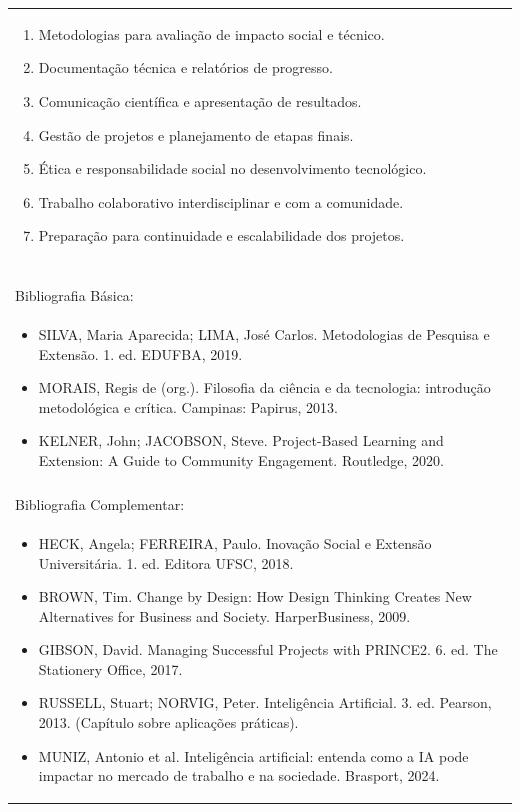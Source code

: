 \documentclass[11pt]{article}
\begin{document}
\begin{center}
\begin{longtable}{|p{4cm}|p{4cm}|p{4cm}|p{4cm}|}
{\begin{enumerate}
\item Metodologias para avaliação de impacto social e técnico.
\item Documentação técnica e relatórios de progresso.
\item Comunicação científica e apresentação de resultados.
\item Gestão de projetos e planejamento de etapas finais.
\item Ética e responsabilidade social no desenvolvimento tecnológico.
\item Trabalho colaborativo interdisciplinar e com a comunidade.
\item Preparação para continuidade e escalabilidade dos projetos.\end{enumerate}}\\
\multicolumn{4}{|p{16cm}|}{}\\
\multicolumn{4}{|p{16cm}|}{}\\
\multicolumn{4}{|p{16cm}|}{\vspace{-1cm}}\\
\multicolumn{4}{|p{16cm}|}{}\\
\hline
\multicolumn{4}{|p{16cm}|}{Bibliografia Básica:}\\
\multicolumn{4}{|p{16cm}|}{%
\begin{itemize}\item SILVA, Maria Aparecida; LIMA, José Carlos. Metodologias de Pesquisa e Extensão. 1. ed. EDUFBA, 2019.
\item MORAIS, Regis de (org.). Filosofia da ciência e da tecnologia: introdução metodológica e crítica. Campinas: Papirus, 2013.
\item KELNER, John; JACOBSON, Steve. Project-Based Learning and Extension: A Guide to Community Engagement. Routledge, 2020.\end{itemize}}\\
\multicolumn{4}{|p{16cm}|}{}\\
\hline
\multicolumn{4}{|p{16cm}|}{Bibliografia Complementar:}\\
\multicolumn{4}{|p{16cm}|}{%
\begin{itemize}\item HECK, Angela; FERREIRA, Paulo. Inovação Social e Extensão Universitária. 1. ed. Editora UFSC, 2018.
\item BROWN, Tim. Change by Design: How Design Thinking Creates New Alternatives for Business and Society. HarperBusiness, 2009.
\item GIBSON, David. Managing Successful Projects with PRINCE2. 6. ed. The Stationery Office, 2017.
\item RUSSELL, Stuart; NORVIG, Peter. Inteligência Artificial. 3. ed. Pearson, 2013. (Capítulo sobre aplicações práticas).
\item MUNIZ, Antonio et al. Inteligência artificial: entenda como a IA pode impactar no mercado de trabalho e na sociedade. Brasport, 2024.\end{itemize}}\\
\hline
\end{longtable}
\end{center}
\end{document}
